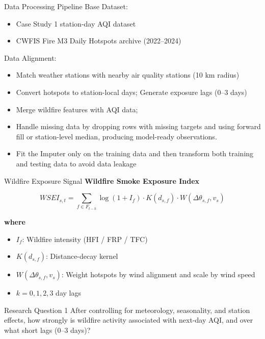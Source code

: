 \documentclass[aspectratio=169]{beamer}
\begin{document}
\begin{frame}{Data Processing Pipeline}
Base Dataset:
\begin{itemize}
\item Case Study 1 station-day AQI dataset
\item CWFIS Fire M3 Daily Hotspots archive (2022--2024)
\end{itemize}

Data Alignment: 
\begin{itemize}
    \item Match weather stations with nearby air quality stations (10 km radius)
    \item Convert hotspots to station-local days; Generate exposure lags (0–3 days)
    \item Merge wildfire features with AQI data; 
    \item Handle missing data by dropping rows with missing targets and using forward fill or station-level median, producing model-ready observations.
    \item Fit the Imputer only on the training data and then transform both training and testing data to avoid data leakage

\end{itemize}
\end{frame}


\begin{frame}{Wildfire Exposure Signal}
\textbf{Wildfire Smoke Exposure Index}

\[
WSEI_{s,t} =
\sum_{f \in F_{t-k}}
\log(1 + I_f)\cdot K(d_{s,f})\cdot W(\Delta \theta_{s,f}, v_s)
\]

\textbf{where}
\begin{itemize}
\item $I_f$: Wildfire intensity (HFI / FRP / TFC)
\item $K(d_{s,f})$: Distance-decay kernel
\item $W(\Delta \theta_{s,f}, v_s)$: Weight hotspots by wind alignment and scale by wind speed
\item $k = 0,1,2,3$ day lags
\end{itemize}
\end{frame}


\begin{frame}{Research Question 1}
After controlling for meteorology, seasonality, and station effects, how strongly is wildfire activity associated with next-day AQI, and over what short lags (0–3 days)?
\end{frame}
\end{document}
